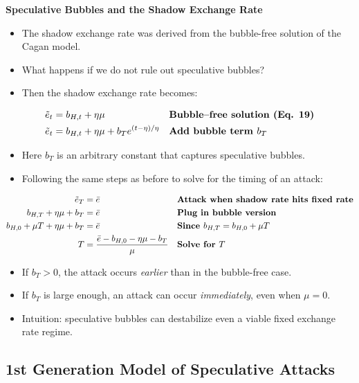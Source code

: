 \documentclass[12pt]{article}
\begin{document}
\noindent\textbf{Speculative Bubbles and the Shadow Exchange Rate}

\begin{itemize}
    \item The shadow exchange rate was derived from the bubble-free solution of the Cagan model.
    \item What happens if we do not rule out speculative bubbles?
    \item Then the shadow exchange rate becomes:
\end{itemize}

\singlespacing
\begin{align}
\tilde e_t &= b_{H,t} + \eta\mu && \text{\textbf{Bubble–free solution (Eq. 19)}} \\
\tilde e_t &= b_{H,t} + \eta\mu + b_T e^{(t-\eta)/\eta} && \text{\textbf{Add bubble term $b_T$}}
\end{align}

\begin{itemize}
    \item Here $b_T$ is an arbitrary constant that captures speculative bubbles.
    \item Following the same steps as before to solve for the timing of an attack:
\end{itemize}

\singlespacing
\begin{align}
\tilde e_T &= \bar e && \text{\textbf{Attack when shadow rate hits fixed rate}} \\
b_{H,T} + \eta\mu + b_T &= \bar e && \text{\textbf{Plug in bubble version}} \\
b_{H,0} + \mu T + \eta\mu + b_T &= \bar e && \text{\textbf{Since $b_{H,T} = b_{H,0} + \mu T$}} \\
T &= \frac{\bar e - b_{H,0} - \eta\mu - b_T}{\mu} && \text{\textbf{Solve for $T$}}
\end{align}

\begin{itemize}
    \item If $b_T > 0$, the attack occurs \textit{earlier} than in the bubble-free case.  
    \item If $b_T$ is large enough, an attack can occur \textit{immediately}, even when $\mu = 0$.  
    \item Intuition: speculative bubbles can destabilize even a viable fixed exchange rate regime.
\end{itemize}

\subsection*{1st Generation Model of Speculative Attacks}
\end{document}
